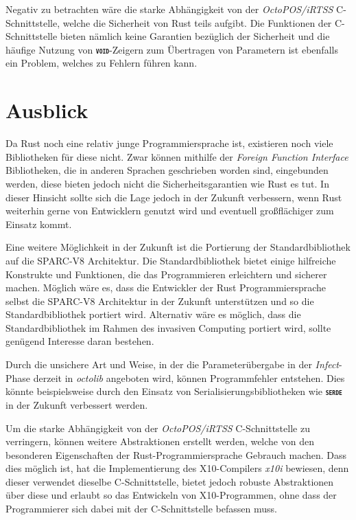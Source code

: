 Negativ zu betrachten wäre die starke Abhängigkeit von der \textit{OctoPOS/iRTSS} C-Schnittstelle,
welche die Sicherheit von Rust teils aufgibt. Die Funktionen der C-Schnittstelle bieten nämlich keine Garantien 
bezüglich der Sicherheit und die häufige Nutzung von \texttt{\textsc{\textbf{void}}}-Zeigern zum Übertragen
von Parametern ist ebenfalls ein Problem, welches zu Fehlern führen kann.

\section{Ausblick}

Da Rust noch eine relativ junge Programmiersprache ist, existieren noch viele Bibliotheken für diese nicht.
Zwar können mithilfe der \textit{Foreign Function Interface} Bibliotheken,
die in anderen Sprachen geschrieben worden sind, eingebunden werden, diese bieten jedoch
nicht die Sicherheitsgarantien wie Rust es tut.
In dieser Hinsicht sollte sich die Lage jedoch in der Zukunft verbessern, wenn Rust
weiterhin gerne von Entwicklern genutzt wird und eventuell großflächiger zum Einsatz kommt.

Eine weitere Möglichkeit in der Zukunft ist die Portierung der Standardbibliothek auf die SPARC-V8 Architektur.
Die Standardbibliothek bietet einige hilfreiche Konstrukte und Funktionen,
die das Programmieren erleichtern und sicherer machen.
Möglich wäre es, dass die Entwickler der Rust Programmiersprache selbst die SPARC-V8 Architektur
in der Zukunft unterstützen und so die Standardbibliothek portiert wird. Alternativ wäre es möglich, dass die 
Standardbibliothek im Rahmen des invasiven Computing portiert wird, sollte genügend Interesse daran bestehen.

Durch die unsichere Art und Weise, in der die Parameterübergabe in der \textit{Infect}-Phase derzeit in
\textit{octolib} angeboten wird, können Programmfehler entstehen. Dies könnte beispielsweise durch den Einsatz von
Serialisierungsbibliotheken wie \texttt{\textsc{\textbf{serde}}} in der Zukunft verbessert werden.

Um die starke Abhängigkeit von der \textit{OctoPOS/iRTSS} C-Schnittstelle zu verringern,
können weitere Abstraktionen erstellt werden, welche von den
besonderen Eigenschaften der Rust-Programmiersprache Gebrauch machen.
Dass dies möglich ist, hat die Implementierung des X10-Compilers \textit{x10i} bewiesen,
denn dieser verwendet dieselbe C-Schnittstelle,
bietet jedoch robuste Abstraktionen über diese und erlaubt so
das Entwickeln von X10-Programmen, ohne dass der Programmierer sich dabei mit der C-Schnittstelle befassen muss.
